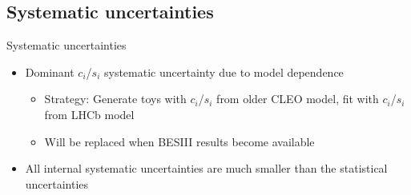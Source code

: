\documentclass{beamer}
\begin{document}
\subsection{Systematic uncertainties}
\begin{frame}{Systematic uncertainties}
  \begin{itemize}
    \setlength\itemsep{1.0em}
    \item{Dominant $c_i$/$s_i$ systematic uncertainty due to model dependence}
    \begin{itemize}
      \item{Strategy: Generate toys with $c_i$/$s_i$ from older CLEO model, fit with $c_i$/$s_i$ from LHCb model}
      \item{Will be replaced when BESIII results become available}
    \end{itemize}
    \item{All internal systematic uncertainties are much smaller than the statistical uncertainties}
  \end{itemize}
\end{frame}
\end{document}
